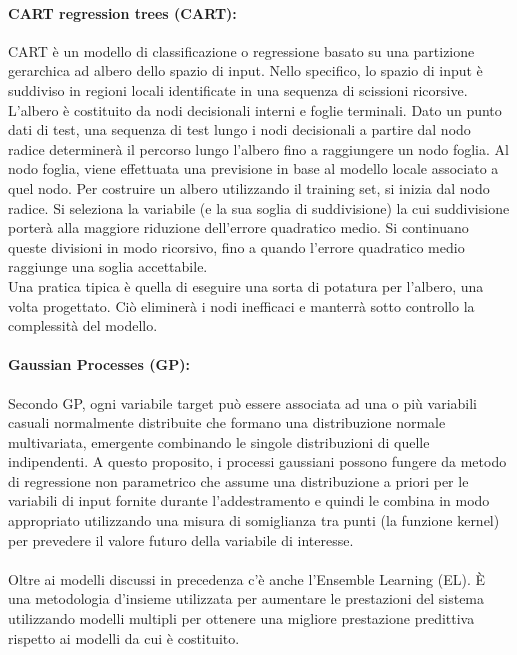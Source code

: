 \documentclass[12pt,a4paper]{report}
\begin{document}
\paragraph*{CART regression trees (CART):}
CART è un modello di classificazione o regressione basato su una partizione gerarchica ad albero dello spazio di input.
Nello specifico, lo spazio di input è suddiviso in regioni locali identificate in una sequenza di scissioni ricorsive. L'albero è costituito da nodi decisionali interni e foglie terminali. Dato un punto dati di test, una sequenza di test lungo i nodi decisionali a partire dal nodo radice determinerà il percorso lungo l'albero fino a raggiungere un nodo foglia. Al nodo foglia, viene effettuata una previsione in base al modello locale associato a quel nodo. Per costruire un albero utilizzando il training set, si inizia dal nodo radice. Si seleziona la variabile (e la sua soglia di suddivisione) la cui suddivisione porterà alla maggiore riduzione dell'errore quadratico medio. Si continuano queste divisioni in modo ricorsivo, fino a quando l'errore quadratico medio raggiunge una soglia accettabile.\\
Una pratica tipica è quella di eseguire una sorta di potatura per l'albero, una volta progettato. Ciò eliminerà i nodi inefficaci e manterrà sotto controllo la complessità del modello. 

\paragraph*{Gaussian Processes (GP):}
Secondo GP, ogni variabile target può essere associata ad una o più variabili casuali normalmente distribuite che formano una distribuzione normale multivariata, emergente combinando le singole distribuzioni di quelle indipendenti. A questo proposito, i processi gaussiani possono fungere da metodo di regressione non parametrico che assume una distribuzione a priori per le variabili di input fornite durante l'addestramento e quindi le combina in modo appropriato utilizzando una misura di somiglianza tra punti (la funzione kernel) per prevedere il valore futuro della variabile di interesse.\\
\\
Oltre ai modelli discussi in precedenza c'è anche l'Ensemble Learning (EL). È una metodologia d'insieme utilizzata per aumentare le prestazioni del sistema utilizzando modelli multipli per ottenere una migliore prestazione predittiva rispetto ai modelli da cui è costituito.
\end{document}

